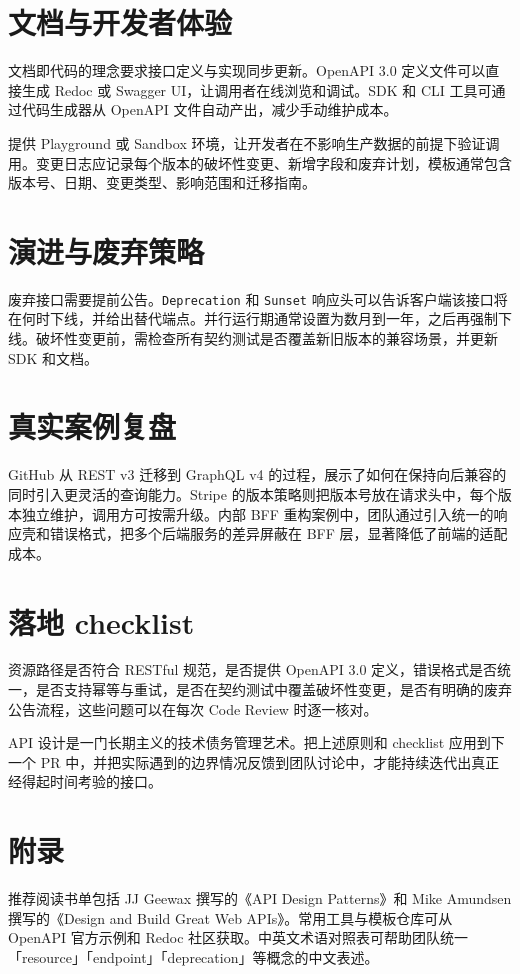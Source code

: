 \chapter{文档与开发者体验}
文档即代码的理念要求接口定义与实现同步更新。OpenAPI 3.0 定义文件可以直接生成 Redoc 或 Swagger UI，让调用者在线浏览和调试。SDK 和 CLI 工具可通过代码生成器从 OpenAPI 文件自动产出，减少手动维护成本。\par
提供 Playground 或 Sandbox 环境，让开发者在不影响生产数据的前提下验证调用。变更日志应记录每个版本的破坏性变更、新增字段和废弃计划，模板通常包含版本号、日期、变更类型、影响范围和迁移指南。\par
\chapter{演进与废弃策略}
废弃接口需要提前公告。\texttt{Deprecation} 和 \texttt{Sunset} 响应头可以告诉客户端该接口将在何时下线，并给出替代端点。并行运行期通常设置为数月到一年，之后再强制下线。破坏性变更前，需检查所有契约测试是否覆盖新旧版本的兼容场景，并更新 SDK 和文档。\par
\chapter{真实案例复盘}
GitHub 从 REST v3 迁移到 GraphQL v4 的过程，展示了如何在保持向后兼容的同时引入更灵活的查询能力。Stripe 的版本策略则把版本号放在请求头中，每个版本独立维护，调用方可按需升级。内部 BFF 重构案例中，团队通过引入统一的响应壳和错误格式，把多个后端服务的差异屏蔽在 BFF 层，显著降低了前端的适配成本。\par
\chapter{落地 checklist}
资源路径是否符合 RESTful 规范，是否提供 OpenAPI 3.0 定义，错误格式是否统一，是否支持幂等与重试，是否在契约测试中覆盖破坏性变更，是否有明确的废弃公告流程，这些问题可以在每次 Code Review 时逐一核对。\par
API 设计是一门长期主义的技术债务管理艺术。把上述原则和 checklist 应用到下一个 PR 中，并把实际遇到的边界情况反馈到团队讨论中，才能持续迭代出真正经得起时间考验的接口。\par
\chapter{附录}
推荐阅读书单包括 JJ Geewax 撰写的《API Design Patterns》和 Mike Amundsen 撰写的《Design and Build Great Web APIs》。常用工具与模板仓库可从 OpenAPI 官方示例和 Redoc 社区获取。中英文术语对照表可帮助团队统一「resource」「endpoint」「deprecation」等概念的中文表述。\par
